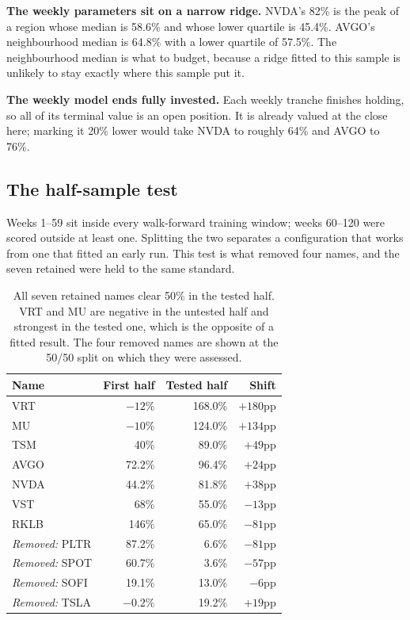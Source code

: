 \documentclass[11pt]{article}
\begin{document}
\textbf{The weekly parameters sit on a narrow ridge.} NVDA's 82\% is the peak of a region whose
median is 58.6\% and whose lower quartile is 45.4\%. AVGO's neighbourhood median is 64.8\% with a
lower quartile of 57.5\%. The neighbourhood median is what to budget, because a ridge fitted to
this sample is unlikely to stay exactly where this sample put it.

\textbf{The weekly model ends fully invested.} Each weekly tranche finishes holding, so all of
its terminal value is an open position. It is already valued at the close here; marking it 20\%
lower would take NVDA to roughly 64\% and AVGO to 76\%.

\subsection{The half-sample test}

Weeks 1--59 sit inside every walk-forward training window; weeks 60--120 were scored outside at
least one. Splitting the two separates a configuration that works from one that fitted an early
run. This test is what removed four names, and the seven retained were held to the same standard.

\begin{table}[H]\centering\small
\begin{tabular}{lrrr}
\toprule
\textbf{Name} & \textbf{First half} & \textbf{Tested half} & \textbf{Shift}\\
\midrule
\rowcolor{bckeep} VRT  & $-12$\% & 168.0\% & $+180$pp\\
MU   & $-10$\% & 124.0\% & $+134$pp\\
\rowcolor{bckeep} TSM  & 40\%  & 89.0\%  & $+49$pp\\
AVGO & 72.2\%  & 96.4\%  & $+24$pp\\
\rowcolor{bckeep} NVDA & 44.2\%  & 81.8\%  & $+38$pp\\
VST  & 68\%  & 55.0\%  & $-13$pp\\
\rowcolor{bckeep} RKLB & 146\% & 65.0\%  & $-81$pp\\
\midrule
\rowcolor{bcwarn} \textit{Removed:} PLTR & 87.2\% & 6.6\% & $-81$pp\\
\rowcolor{bcwarn} \textit{Removed:} SPOT & 60.7\% & 3.6\% & $-57$pp\\
\rowcolor{bcwarn} \textit{Removed:} SOFI & 19.1\% & 13.0\% & $-6$pp\\
\rowcolor{bcwarn} \textit{Removed:} TSLA & $-0.2$\% & 19.2\% & $+19$pp\\
\bottomrule
\end{tabular}
\caption{All seven retained names clear 50\% in the tested half. VRT and MU are negative in the
untested half and strongest in the tested one, which is the opposite of a fitted result. The four
removed names are shown at the 50/50 split on which they were assessed.}
\end{table}
\end{document}

